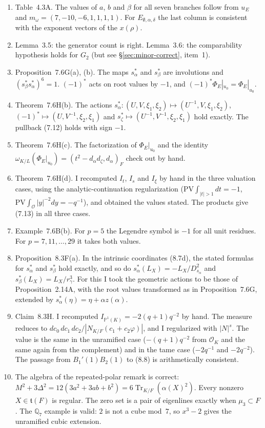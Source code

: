 \documentclass[12pt,letterpaper]{amsart}
\begin{document}
\begin{enumerate}[label=(C\arabic*)]
\item Table~4.3A. The values of $a$, $b$ and $\beta$ for all seven branches
follow from $u_E$ and $m_\omega=(7,-10,-6,1,1,1,1)$. For
$E_{\emptyset,\alpha,\delta}$ the last column is consistent with the exponent
vectors of the $x(\rho)$.
\item Lemma~3.5: the generator count is right. Lemma~3.6: the comparability
hypothesis holds for $G_2$ (but see \S\ref{sec:minor-correct}, item~1).
\item Proposition~7.6G(a), (b). The maps $s_\alpha^*$ and $s_\beta^*$ are
involutions and $(s_\beta^*s_\alpha^*)^6=1$. $(-1)^*$ acts on root values by
$-1$, and $(-1)^*\Phi_E|_{u_0}=\Phi_E|_{u_0}$.
\item Theorem~7.6H(b). The actions $s_\alpha^*:(U,V,\xi_1,\xi_2)\mapsto
(U^{-1},V,\xi_1,\xi_2)$, $(-1)^*\mapsto(U,V^{-1},\xi_2,\xi_1)$ and
$s_\zeta^*\mapsto(U^{-1},V^{-1},\xi_2,\xi_1)$ hold exactly. The pullback
(7.12) holds with sign $-1$.
\item Theorem~7.6H(c). The factorization of $\Phi_E|_{u_0}$ and the identity
$\omega_{K/L}(\Phi_E|_{u_0})=(t^2-d_\alpha d_\zeta,d_\alpha)_F$ check out by hand.
\item Theorem~7.6H(d). I recomputed $I_t$, $I_s$ and $I_\xi$ by hand in the
three valuation cases, using the analytic-continuation regularization
($\mathrm{PV}\!\int_{|t|>1}dt=-1$, $\mathrm{PV}\!\int_{\mathcal O}|y|^{-2}dy=-q^{-1}$),
and obtained the values stated. The products give (7.13) in all three
cases.
\item Example~7.6B(b). For $p=5$ the Legendre symbol is $-1$ for all unit
residues. For $p=7,11,\dots,29$ it takes both values.
\item Proposition~8.3F(a). In the intrinsic coordinates (8.7d), the
stated formulas for $s_\alpha^*$ and $s_\beta^*$ hold exactly, and so do
$s_\alpha^*(L_X)=-L_X/D_{s_\alpha}^2$ and $s_\beta^*(L_X)=L_X/r_\gamma^3$. For
this I took the geometric actions to be those of Proposition~2.14A, with the
root values transformed as in Proposition~7.6G, extended by
$s_\alpha^*(\eta)=\eta+\alpha z(\alpha)$.
\item Claim~8.3H. I recomputed $I_{\mathbb P^1(K)}=-2(q+1)q^{-2}$ by hand. The
measure reduces to $dc_0\,dc_1\,dc_2/|N_{K/F}(c_1+c_2\varphi)|$, and I
regularized with $|N|^{s}$. The value is the same in the unramified case
($-(q+1)q^{-2}$ from $\mathcal O_K$ and the same again from the complement) and
in the tame case ($-2q^{-1}$ and $-2q^{-2}$). The passage from $B_1'(1)B_2(1)$
to (8.8) is arithmetically consistent.
\item The algebra of the repeated-polar remark is correct:
$M^2+3\Delta^2=12(3a^2+3ab+b^2)=6\operatorname{Tr}_{K/F}(\alpha(X)^2)$. Every
nonzero $X\in\mathfrak t(F)$ is regular. The zero set is a pair of eigenlines
exactly when $\mu_3\subset F$. The $\mathbb Q_7$ example is valid: $2$ is not
a cube mod~$7$, so $x^3-2$ gives the unramified cubic extension.
\end{enumerate}
\end{document}
